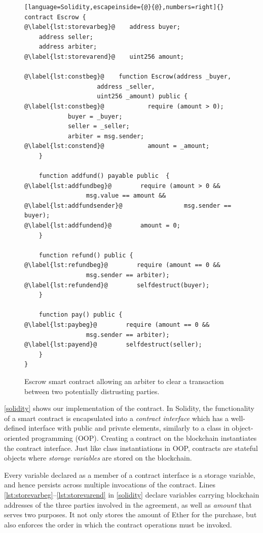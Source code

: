 \documentclass[sigplan,10pt]{acmart}\settopmatter{printfolios=true,printccs=false,printacmref=false}
\begin{document}
\begin{figure}[h!]
\begin{lstlisting}[language=Solidity,escapeinside={@}{@},numbers=right]{}
contract Escrow {
@\label{lst:storevarbeg}@    address buyer;
    address seller;
    address arbiter;
@\label{lst:storevarend}@    uint256 amount;

@\label{lst:constbeg}@    function Escrow(address _buyer,
                    address _seller,
                    uint256 _amount) public {
@\label{lst:constbeg}@            require (amount > 0);
            buyer = _buyer;
            seller = _seller;
            arbiter = msg.sender;
@\label{lst:constend}@            amount = _amount;
    }

    function addfund() payable public  {
@\label{lst:addfundbeg}@        require (amount > 0 &&
                 msg.value == amount &&
@\label{lst:addfundsender}@                 msg.sender == buyer);
@\label{lst:addfundend}@        amount = 0;
    }

    function refund() public {
@\label{lst:refundbeg}@        require (amount == 0 &&
                 msg.sender == arbiter);
@\label{lst:refundend}@        selfdestruct(buyer);
    }

    function pay() public {
@\label{lst:paybeg}@        require (amount == 0 &&
                 msg.sender == arbiter);
@\label{lst:payend}@        selfdestruct(seller);
    }
}
\end{lstlisting}
\caption{Escrow smart contract allowing an arbiter to clear a
 transaction between two potentially distrusting parties.}
\label{solidity}
\end{figure}

\autoref{solidity} shows our implementation of the contract.
In Solidity, the functionality of a smart contract is encapsulated into a
\textit{contract interface} which has a well-defined interface with public and private elements, 
similarly to a class in object-oriented programming (OOP).
Creating a contract on the blockchain instantiates the contract interface.
Just like class instantiations in OOP, contracts are stateful objects
where \emph{storage variables} are stored on the blockchain.

Every variable declared as a member of a contract interface is
a storage variable, and hence persists across multiple invocations of the contract.
Lines \autoref{lst:storevarbeg}--\autoref{lst:storevarend} in \autoref{solidity}
declare variables carrying blockchain addresses of the three parties
involved in the agreement, as well as \textit{amount} that serves two purposes.
It not only stores
the amount of Ether for the purchase, but also enforces the order
in which the contract operations must be invoked.
\end{document}

